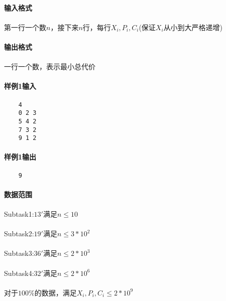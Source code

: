 \documentclass[UTF8]{ctexart}
\begin{document}
\paragraph{输入格式}
\paragraph{}第一行一个数$n$，接下来$n$行，每行$X_i,P_i,C_i$(保证$X_i$从小到大严格递增)
\paragraph{输出格式}
\paragraph{}一行一个数，表示最小总代价
\paragraph{样例1输入}
\begin{lstlisting}
    4
    0 2 3
    5 4 2
    7 3 2
    9 1 2
\end{lstlisting}
\paragraph{样例1输出}
\begin{lstlisting}
    9
\end{lstlisting}

\clearpage

\paragraph{数据范围}
\paragraph{}Subtask1:$13'$满足$n\leq 10$
\paragraph{}Subtask2:$19'$满足$n\leq 3*10^2$
\paragraph{}Subtask3:$36'$满足$n\leq 2*10^3$
\paragraph{}Subtask4:$32'$满足$n\leq 2*10^6$
\paragraph{}对于$100\%$的数据，满足$X_i,P_i,C_i\leq 2*10^9$
\end{document}
